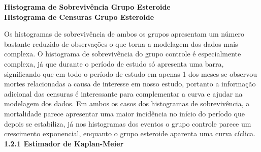 \documentclass[12pt,a4paper]{article}
\begin{document}
\begin{center}
		\textbf{Histograma de Sobrevivência Grupo Esteroide}
	\vspace{1cm}\\
	\textbf{Histograma de Censuras Grupo Esteroide}
	\end{center}
	\vspace{1cm}
	Os histogramas de sobrevivência de ambos os grupos apresentam um número bastante reduzido de observações o que torna a modelagem dos dados mais complexa. O histograma de sobrevivência do grupo controle é especialmente complexa, já que durante o período de estudo só apresenta uma barra, significando que em todo o período de estudo em apenas 1 dos meses se observou mortes relacionadas a causa de interesse em nosso estudo, portanto a informação adicional das censuras é interessante para complementar a curva e ajudar na modelagem dos dados. Em ambos os casos dos histogramas de sobrevivência, a mortalidade parece apresentar uma maior incidência no início do período que depois se estabiliza, já nos histogramas dos eventos o grupo controle parece um crescimento exponencial, enquanto o grupo esteroide aparenta uma curva cíclica.
	\vspace{1cm}\\
	\textbf{1.2.1 Estimador de Kaplan-Meier}\\
\end{document}
